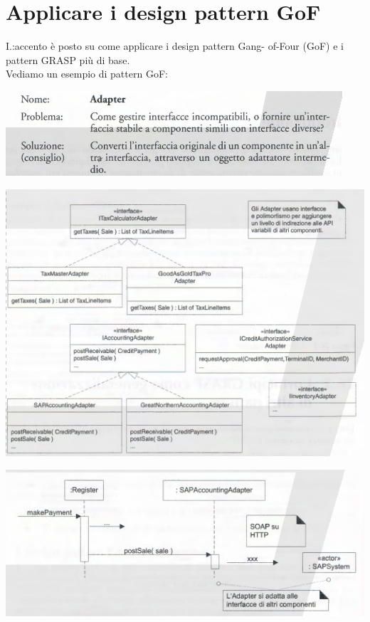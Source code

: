 \documentclass[a4paper,12pt, oneside]{book}
\begin{document}
\chapter{Applicare i design pattern GoF}
I.:accento è posto su come applicare i design pattern Gang-
of-Four (GoF) e i pattern GRASP più di base.\\
Vediamo un esempio di pattern GoF:
\begin{center}
\includegraphics[scale = 0.7]{img/gof.png}
\end{center}
\begin{center}
\includegraphics[scale = 0.7]{img/gof2.png}
\end{center}
\begin{center}
\includegraphics[scale = 0.7]{img/gof3.png}
\end{center}
\end{document}
